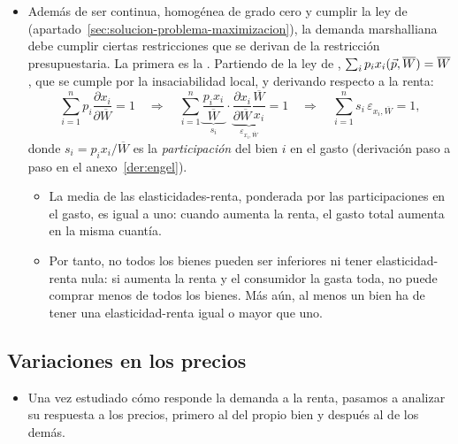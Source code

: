\documentclass[11pt]{article}
\begin{document}
\begin{itemize}
\item Además de ser continua, homogénea de grado cero y cumplir la ley de  (apartado~\ref{sec:solucion-problema-maximizacion}), la demanda marshalliana debe cumplir ciertas restricciones que se derivan de la restricción presupuestaria. La primera es la . Partiendo de la ley de , $\sum_{i}p_ix_i(\vec{p},\overline{W})=\overline{W}$, que se cumple por la insaciabilidad local, y derivando respecto a la renta:
  \begin{equation}
  \sum_{i=1}^{n}p_i\frac{\partial x_i}{\partial\overline{W}}=1\quad\Longrightarrow\quad\sum_{i=1}^{n}\underbrace{\frac{p_ix_i}{\overline{W}}}_{s_i}\cdot\underbrace{\frac{\partial x_i}{\partial\overline{W}}\frac{\overline{W}}{x_i}}_{\varepsilon_{x_i,\overline{W}}}=1\quad\Longrightarrow\quad\sum_{i=1}^{n}s_i\,\varepsilon_{x_i,\overline{W}}=1, \label{eq:agregacion-engel}
  \end{equation}
  donde $s_i=p_ix_i/\overline{W}$ es la \emph{participación} del bien $i$ en el gasto (derivación paso a paso en el anexo~\ref{der:engel}).
  \begin{itemize}
  \item La media de las elasticidades-renta, ponderada por las participaciones en el gasto, es igual a uno: cuando aumenta la renta, el gasto total aumenta en la misma cuantía.
  \item Por tanto, no todos los bienes pueden ser inferiores ni tener elasticidad-renta nula: si aumenta la renta y el consumidor la gasta toda, no puede comprar menos de todos los bienes. Más aún, al menos un bien ha de tener una elasticidad-renta igual o mayor que uno.
  \end{itemize}
\end{itemize}

\subsection{Variaciones en los precios}\label{sec:variaciones-precios}

\begin{itemize}
\item Una vez estudiado cómo responde la demanda a la renta, pasamos a analizar su respuesta a los precios, primero al del propio bien y después al de los demás.
\end{itemize}
\end{document}

